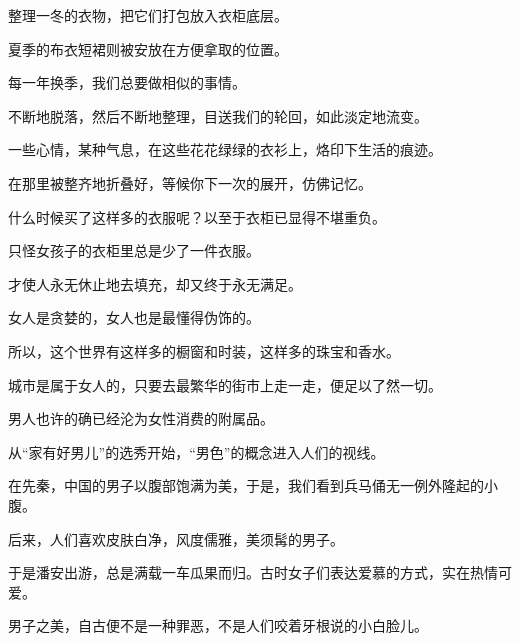 \documentclass[12pt,a4paper]{article}
\begin{document}
	\endwriting



		整理一冬的衣物，把它们打包放入衣柜底层。\par
		夏季的布衣短裙则被安放在方便拿取的位置。\par
		每一年换季，我们总要做相似的事情。\par
		不断地脱落，然后不断地整理，目送我们的轮回，如此淡定地流变。\par
		一些心情，某种气息，在这些花花绿绿的衣衫上，烙印下生活的痕迹。\par
		在那里被整齐地折叠好，等候你下一次的展开，仿佛记忆。


		什么时候买了这样多的衣服呢？以至于衣柜已显得不堪重负。\par
		只怪女孩子的衣柜里总是少了一件衣服。\par
		才使人永无休止地去填充，却又终于永无满足。\par
		女人是贪婪的，女人也是最懂得伪饰的。\par
		所以，这个世界有这样多的橱窗和时装，这样多的珠宝和香水。\par
		城市是属于女人的，只要去最繁华的街市上走一走，便足以了然一切。

		男人也许的确已经沦为女性消费的附属品。\par
		从“家有好男儿”的选秀开始，“男色”的概念进入人们的视线。\par
		在先秦，中国的男子以腹部饱满为美，于是，我们看到兵马俑无一例外隆起的小腹。\par
		后来，人们喜欢皮肤白净，风度儒雅，美须髯的男子。\par
		于是潘安出游，总是满载一车瓜果而归。古时女子们表达爱慕的方式，实在热情可爱。\par
		男子之美，自古便不是一种罪恶，不是人们咬着牙根说的小白脸儿。
\end{document}
